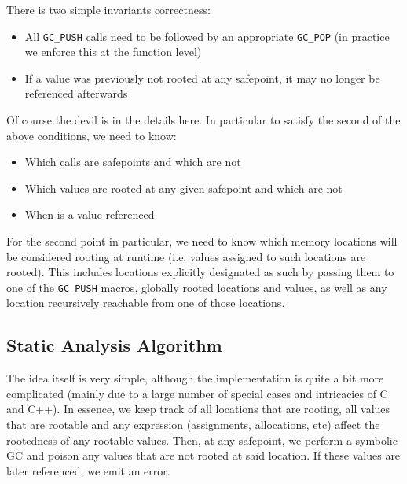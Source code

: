 There is two simple invariants correctness:



\begin{itemize}
\item All \texttt{GC\_PUSH} calls need to be followed by an appropriate \texttt{GC\_POP} (in practice we enforce this at the function level)


\item If a value was previously not rooted at any safepoint, it may no longer be referenced afterwards

\end{itemize}


Of course the devil is in the details here. In particular to satisfy the second of the above conditions, we need to know:



\begin{itemize}
\item Which calls are safepoints and which are not


\item Which values are rooted at any given safepoint and which are not


\item When is a value referenced

\end{itemize}


For the second point in particular, we need to know which memory locations will be considered rooting at runtime (i.e. values assigned to such locations are rooted). This includes locations explicitly designated as such by passing them to one of the \texttt{GC\_PUSH} macros, globally rooted locations and values, as well as any location recursively reachable from one of those locations.



\hypertarget{7498210263575228495}{}


\subsection{Static Analysis Algorithm}



The idea itself is very simple, although the implementation is quite a bit more complicated (mainly due to a large number of special cases and intricacies of C and C++). In essence, we keep track of all locations that are rooting, all values that are rootable and any expression (assignments, allocations, etc) affect the rootedness of any rootable values. Then, at any safepoint, we perform a {\textquotedbl}symbolic GC{\textquotedbl} and poison any values that are not rooted at said location. If these values are later referenced, we emit an error.



